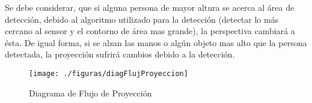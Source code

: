 \documentclass[a4paper,openright,12pt]{report}
\begin{document}
Se debe considerar, que si alguna persona de mayor altura se acerca al área de detección, debido al algoritmo utilizado para la detección (detectar lo más cercano al sensor y el contorno de área mas grande), la perspectiva cambiará a ésta. De igual forma, si se alzan las manos o algún objeto mas alto que la persona detectada, la proyección sufrirá cambios debido a la detección.
\begin{figure}[thb]
	\centering
	\texttt{[image: ./figuras/diagFlujProyeccion]}
	\caption{Diagrama de Flujo de Proyección} \label{fig:diagFlujProyeccion}
\end{figure}
\begin{comment}
\begin{algorithm}[tbh]
	\SetAlgoLined
	\KwData{Imagen Depth, Imagen RGB, class Persona	}
	\KwResult{Calcular posición de la persona en imagen Depth}
	Obtener contorno de la class Persona\;
	Calcular centro del contorno usando Momentos\;
	Calcular distancia entre posición anterior y actual\;
	\If{distancia $<$ 5}{
		posición actual = posición anterior
	}
	Guardar posición actual en class Persona\;
	Mostrar imagen RGB con punto central\;
	\caption{Posición de la Persona}
	\label{alg:posicion}
\end{algorithm}
\end{comment}

\begin{comment}
\begin{algorithm}[tbh]
	\SetAlgoLined
	\KwIn{Posición persona (x,y)}
	\KwData{Punto Central $\rightarrow$ (-35.0, 24.0, 0.0)}
	\KwResult{Posicionar cámara virtual respecto a posición de la persona, enfocando a punto central}
	Obtener Posición de la persona\;
	Posición cámara $\rightarrow$ Posición persona $/$ 10\;
	
	\If{Posición cámara $!=$ Posición cámara anterior}{
		Calcular ángulo z entre Posición cámara y Punto Central\;
		Rotar cámara en el ángulo z calculado\;
		Rotar ventana de cámara\;
	}
	Ubicar cámara en la Posición cámara\;
	\caption{proyección de la Persona}
\end{algorithm}
\end{comment}
\end{document}
